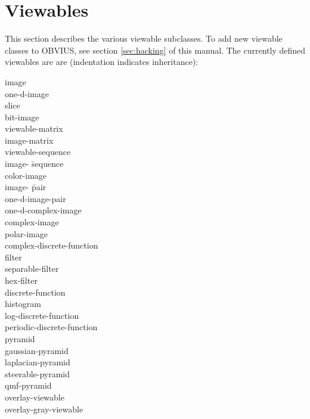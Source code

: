 \section{Viewables}
\label{sec:viewables}

This section describes the various viewable subclasses.  To add new
viewable classes to OBVIUS, see section \ref{sec:hacking} of this
manual.  The currently defined viewables are are (indentation
indicates inheritance):
\begin{tabbing}
image \= \\
\> one-d-image \\
\> slice \= \\
\> bit-image \\
viewable-matrix \\
\> image-matrix \\
\> viewable-sequence \\
\> \> image- \= sequence \\
\> \> \> color-image \\
\> \> \> image- \= pair \\
\> \> \> \> one-d-image-pair \\
\> \> \> \> one-d-complex-image \\
\> \> \> \> complex-image \\
\> \> \> \> polar-image \\
\> \> complex-discrete-function \\
filter \\
\> separable-filter \\
\> hex-filter \\
discrete-function \\
\> histogram \\
\> log-discrete-function \\
\> periodic-discrete-function \\
pyramid \\
\> gaussian-pyramid \\
\> laplacian-pyramid \\
\> steerable-pyramid \\
\> qmf-pyramid \\
overlay-viewable \\
\> overlay-gray-viewable \\
\end{tabbing}


